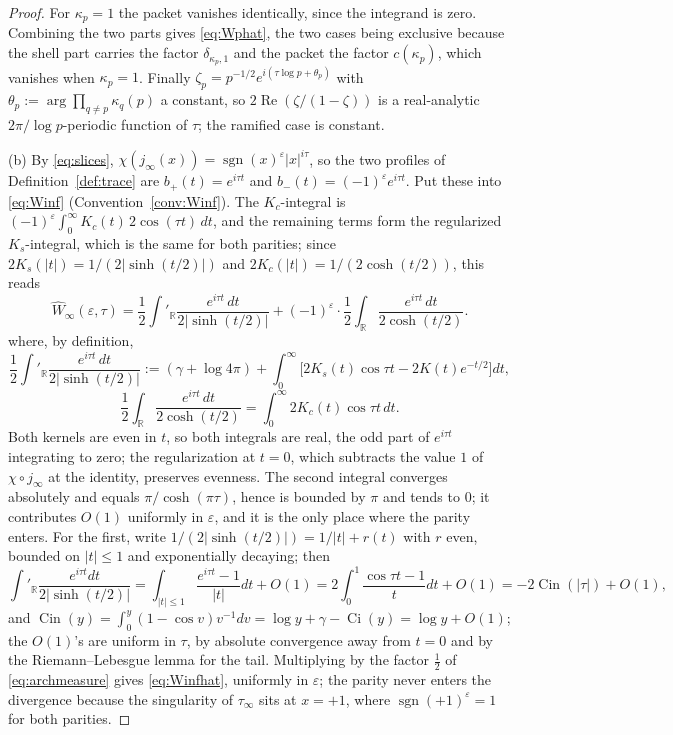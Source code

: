 \documentclass[11pt]{amsart}
\theoremstyle{definition}
\theoremstyle{remark}
\newcommand{\R}{\mathbb R}
\newcommand{\Rel}{\operatorname{Re}}
\newcommand{\sgn}{\operatorname{sgn}}
\newcommand{\Wh}{\widehat{W}}
\begin{document}
\begin{proof}
For $\kappa_p=1$ the packet vanishes identically, since the integrand is
zero.  Combining the two parts gives \eqref{eq:Wphat}, the two cases being exclusive because the shell
part carries the factor $\delta_{\kappa_p,1}$ and the packet the factor
$c(\kappa_p)$, which vanishes when $\kappa_p=1$.  Finally
$\zeta_p=p^{-1/2}e^{i(\tau\log p+\theta_p)}$ with
$\theta_p:=\arg\prod_{q\ne p}\kappa_q(p)$ a constant, so
$2\Rel(\zeta/(1-\zeta))$ is a real-analytic $2\pi/\log p$-periodic function of
$\tau$; the ramified case is constant.

(b)  By \eqref{eq:slices}, $\chi(j_{\infty}(x))=\sgn(x)^{\varepsilon}
|x|^{i\tau}$, so the two profiles of Definition~\ref{def:trace} are
$b_{+}(t)=e^{i\tau t}$ and $b_{-}(t)=(-1)^{\varepsilon}e^{i\tau t}$.  Put
these into \eqref{eq:Winf} (Convention~\ref{conv:Winf}).  The $K_{c}$-integral
is $(-1)^{\varepsilon}\int_0^{\infty}K_c(t)\,2\cos(\tau t)\,dt$, and the
remaining terms form the regularized $K_{s}$-integral, which is the same for
both parities; since $2K_{s}(|t|)=1/(2|\sinh(t/2)|)$ and
$2K_{c}(|t|)=1/(2\cosh(t/2))$, this reads
\begin{equation}\label{eq:Winfhat2}
\Wh_{\infty}(\varepsilon,\tau)=\frac12\int'_{\R}
\frac{e^{i\tau t}\,dt}{2|\sinh(t/2)|}
+(-1)^{\varepsilon}\cdot\frac12\int_{\R}\frac{e^{i\tau t}\,dt}{2\cosh(t/2)} .
\end{equation}
where, by definition,
\[
\frac12\int'_{\R}\frac{e^{i\tau t}\,dt}{2|\sinh(t/2)|}
:=(\gamma+\log4\pi)+\int_0^{\infty}\bigl[2K_{s}(t)\cos\tau t-2K(t)e^{-t/2}\bigr]dt,
\]
\[
\frac12\int_{\R}\frac{e^{i\tau t}\,dt}{2\cosh(t/2)}=\int_0^{\infty}2K_{c}(t)\cos\tau t\,dt .
\]
Both kernels are even in $t$, so both integrals are real, the odd part of
$e^{i\tau t}$ integrating to zero; the regularization at $t=0$, which subtracts
the value $1$ of $\chi\circ j_{\infty}$ at the identity, preserves evenness.
The second integral converges absolutely and equals $\pi/\cosh(\pi\tau)$, hence
is bounded by $\pi$ and tends to $0$; it contributes $O(1)$ uniformly in
$\varepsilon$, and it is the only place where the parity enters.  For the first,
write $1/(2|\sinh(t/2)|)=1/|t|+r(t)$ with $r$ even, bounded on $|t|\le1$ and
exponentially decaying; then
\[
\int'_{\R}\frac{e^{i\tau t}dt}{2|\sinh(t/2)|}
=\int_{|t|\le1}\frac{e^{i\tau t}-1}{|t|}dt+O(1)
=2\int_0^{1}\frac{\cos\tau t-1}{t}dt+O(1)
=-2\operatorname{Cin}(|\tau|)+O(1),
\]
and $\operatorname{Cin}(y)=\int_0^{y}(1-\cos v)v^{-1}dv=\log y+\gamma-
\operatorname{Ci}(y)=\log y+O(1)$; the $O(1)$'s are uniform in $\tau$, by
absolute convergence away from $t=0$ and by the Riemann--Lebesgue lemma for the
tail.  Multiplying by the factor $\tfrac12$ of \eqref{eq:archmeasure} gives
\eqref{eq:Winfhat}, uniformly in $\varepsilon$; the parity never enters the
divergence because the singularity of $\tau_{\infty}$ sits at $x=+1$, where
$\sgn(+1)^{\varepsilon}=1$ for both parities.


\end{proof}
\end{document}
